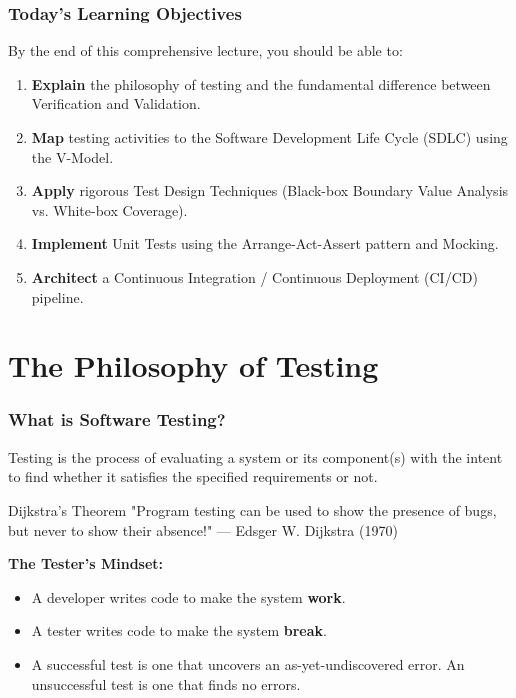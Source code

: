 \documentclass[xcolor=table]{beamer}
\begin{document}
\begin{frame}
    \frametitle{Today's Learning Objectives}
    By the end of this comprehensive lecture, you should be able to:
    \begin{enumerate}
        \item \textbf{Explain} the philosophy of testing and the fundamental difference between Verification and Validation.
        \item \textbf{Map} testing activities to the Software Development Life Cycle (SDLC) using the V-Model.
        \item \textbf{Apply} rigorous Test Design Techniques (Black-box Boundary Value Analysis vs. White-box Coverage).
        \item \textbf{Implement} Unit Tests using the Arrange-Act-Assert pattern and Mocking.
        \item \textbf{Architect} a Continuous Integration / Continuous Deployment (CI/CD) pipeline.
    \end{enumerate}
\end{frame}

\section{The Philosophy of Testing}

\begin{frame}
    \frametitle{What is Software Testing?}
    Testing is the process of evaluating a system or its component(s) with the intent to find whether it satisfies the specified requirements or not.
    
    \vspace{0.3cm}
    \begin{alertblock}{Dijkstra's Theorem}
        "Program testing can be used to show the presence of bugs, but never to show their absence!" — Edsger W. Dijkstra (1970)
    \end{alertblock}
    
    \vspace{0.3cm}
    \textbf{The Tester's Mindset:}
    \begin{itemize}
        \item A developer writes code to make the system \textbf{work}.
        \item A tester writes code to make the system \textbf{break}.
        \item A successful test is one that uncovers an as-yet-undiscovered error. An unsuccessful test is one that finds no errors.
    \end{itemize}
\end{frame}
\end{document}
